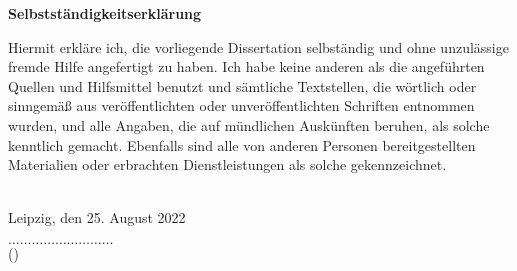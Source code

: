 \newpage
\begin{center}
{\bf Selbstst\"andigkeitserkl\"arung}
\end{center}
Hiermit erkl\"are ich, die vorliegende Dissertation selbst\"andig und ohne
unzul\"assige fremde Hilfe angefertigt zu haben. Ich habe keine anderen
als die angef\"uhrten Quellen und Hilfsmittel benutzt und s\"amtliche 
Textstellen, die w\"ortlich oder sinngem\"a{\ss} aus ver\"offentlichten oder unver\"offentlichten Schriften entnommen wurden, und alle Angaben, die auf m\"undlichen Ausk\"unften beruhen, als solche kenntlich gemacht. 
Ebenfalls sind alle von anderen Personen bereitgestellten Materialien 
oder erbrachten Dienstleistungen als solche gekennzeichnet.\\
\\
\begin{flushleft}
Leipzig, den 25. August 2022
\end{flushleft}
\vspace*{0.5cm}
\begin{flushleft}
$\ldots\ldots\ldots\ldots\ldots\ldots\ldots\ldots\ldots$\\
{\small(\me)}
\end{flushleft}